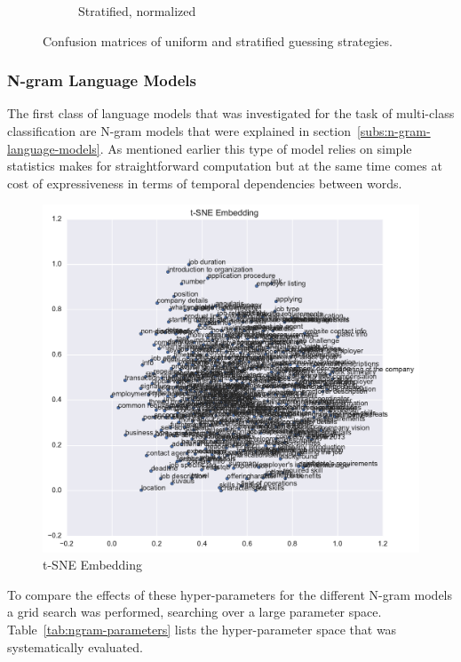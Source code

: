 \begin{figure}[h]
\begin{subfigure}[b]{0.48\textwidth}
        \caption{Stratified, normalized}
        \label{fig:exp-vector-space-conf-matrix-guessing-stratified-normalized}
    \end{subfigure}
    \caption{Confusion matrices of uniform and stratified guessing strategies. }
  \label{fig:exp-vector-space-conf-matrix-guessing}
\end{figure}

\subsubsection{N-gram Language Models}

The first class of language models that was investigated for the task of multi-class classification are N-gram models that were explained in section~\ref{subs:n-gram-language-models}. As mentioned earlier this type of model relies on simple statistics makes for straightforward computation but at the same time comes at cost of expressiveness in terms of temporal dependencies between words.

\begin{figure}[h]
    \centering
    \includegraphics[width=\textwidth]{img/paragraph-data-tSNE.pdf}
    \caption{t-SNE Embedding}
  \label{fig:paragraph-data-tSNE}
\end{figure}

To compare the effects of these hyper-parameters for the different N-gram models a grid search was performed, searching over a large parameter space. Table~\ref{tab:ngram-parameters} lists the hyper-parameter space that was systematically evaluated.

